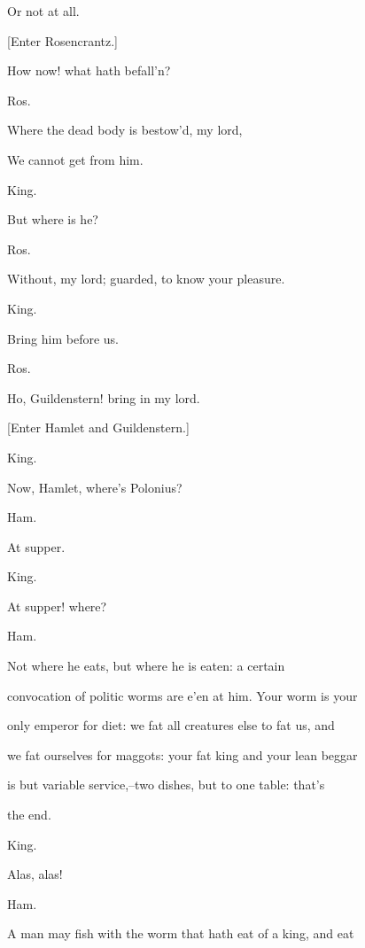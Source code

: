 \documentclass[12pt]{book}
\begin{document}
Or not at all.



[Enter Rosencrantz.]



How now! what hath befall'n?



Ros.

Where the dead body is bestow'd, my lord,

We cannot get from him.



King.

But where is he?



Ros.

Without, my lord; guarded, to know your pleasure.



King.

Bring him before us.



Ros.

Ho, Guildenstern! bring in my lord.



[Enter Hamlet and Guildenstern.]



King.

Now, Hamlet, where's Polonius?



Ham.

At supper.



King.

At supper! where?



Ham.

Not where he eats, but where he is eaten: a certain

convocation of politic worms are e'en at him. Your worm is your

only emperor for diet: we fat all creatures else to fat us, and

we fat ourselves for maggots: your fat king and your lean beggar

is but variable service,--two dishes, but to one table: that's

the end.



King.

Alas, alas!



Ham.

A man may fish with the worm that hath eat of a king, and eat
\end{document}
